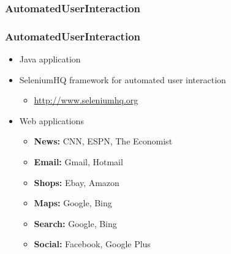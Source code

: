 \documentclass{beamer}
\begin{document}
	\subsubsection{AutomatedUserInteraction}
	\begin{frame}
		\frametitle{AutomatedUserInteraction}
		\begin{itemize}
			\item Java application
			\item SeleniumHQ framework for automated user interaction
			\begin{itemize}
				\item \href{http://www.seleniumhq.org/}{http://www.seleniumhq.org}
			\end{itemize}
			\item Web applications
			\begin{itemize}
				\item \textbf{News:} CNN, ESPN, The Economist
				\item \textbf{Email:} Gmail, Hotmail
				\item \textbf{Shops:} Ebay, Amazon
				\item \textbf{Maps:} Google, Bing
				\item \textbf{Search:} Google, Bing
				\item \textbf{Social:} Facebook, Google Plus
			\end{itemize}
		\end{itemize}
	\end{frame}
	
\end{document}
